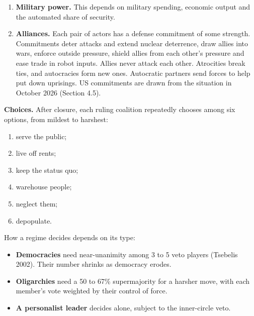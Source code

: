 \documentclass[
  10pt,
]{article}
\providecommand{\tightlist}{%
  \setlength{\itemsep}{0pt}\setlength{\parskip}{0pt}}
\begin{document}
\begin{enumerate}
  Each trait keeps its published distribution, but traits are now correlated through seven drives
  (survival, status, meaning, connection, autonomy, comfort and curiosity), drawn per member with
  tilts by institution. A member driven by status, for example, tends to have both a lower moral
  cost and less concern for the public.

  Members can purge each other, and purges can trigger counter-coups. A leader who holds half or
  more of coercive control rules alone. The inner circle can still block a decision, but its chance
  of success falls as automation grows.
\item
  \textbf{Military power.} This depends on military spending, economic output and the automated
  share of security.
\item
  \textbf{Alliances.} Each pair of actors has a defense commitment of some strength. Commitments
  deter attacks and extend nuclear deterrence, draw allies into wars, enforce outside pressure,
  shield allies from each other's pressure and ease trade in robot inputs. Allies never attack each
  other. Atrocities break ties, and autocracies form new ones. Autocratic partners send forces to
  help put down uprisings. US commitments are drawn from the situation in October 2026 (Section
  4.5).
\end{enumerate}

\textbf{Choices.} After closure, each ruling coalition repeatedly chooses among six options, from
mildest to harshest:

\begin{enumerate}
\def\labelenumi{\arabic{enumi}.}
\tightlist
\item
  serve the public;
\item
  live off rents;
\item
  keep the status quo;
\item
  warehouse people;
\item
  neglect them;
\item
  depopulate.
\end{enumerate}

How a regime decides depends on its type:

\begin{itemize}
\tightlist
\item
  \textbf{Democracies} need near-unanimity among 3 to 5 veto players (Tsebelis 2002). Their number
  shrinks as democracy erodes.
\item
  \textbf{Oligarchies} need a 50 to 67\% supermajority for a harsher move, with each member's vote
  weighted by their control of force.
\item
  \textbf{A personalist leader} decides alone, subject to the inner-circle veto.
\end{itemize}
\end{document}

